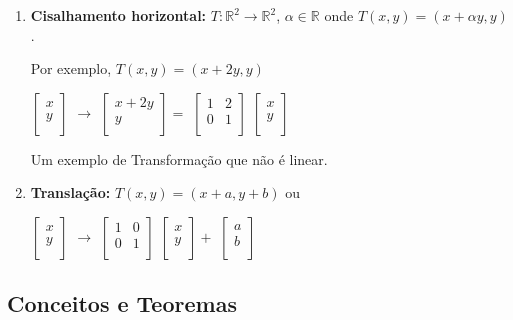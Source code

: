 \documentclass[oneside,a4paper,12pt]{article}
\begin{document}
\begin{enumerate}
	\vspace{150pt}
	
	\item {\bf Cisalhamento horizontal:} $T:\mathbb{R}^2 \rightarrow \mathbb{R}^2$, $\alpha \in \mathbb{R}$ onde $T(x,y) = (x + \alpha y, y)$.
	
	Por exemplo, $T(x,y) = (x + 2y, y)$ 
	
	$\left[
	\begin{array}{c}
	x\\
	y \\
	\end{array}
	\right]$ $\rightarrow$
	$\left[
	\begin{array}{c}
	x + 2y	\\
	y	\\
	\end{array}
	\right] = $
	$\left[
	\begin{array}{cc}
	1	&	2\\
	0	&	1 \\
	\end{array}
	\right]$
	$\left[
	\begin{array}{c}
	x\\
	y \\
	\end{array}
	\right]$
	
	
	Um exemplo de Transformação que não é linear.
	\item {\bf Translação:} $T(x,y) = (x + a,y + b)$ ou
	
	$\left[
	\begin{array}{c}
	x\\
	y \\
	\end{array}
	\right]$ $\rightarrow$
	$\left[
	\begin{array}{cc}
	1	&	0	\\
	0	&	1	\\
	\end{array}
	\right]  $
	$\left[
	\begin{array}{c}
	x \\
	y \\
	\end{array}
	\right] + $
	$\left[
	\begin{array}{c}
	a\\
	b \\
	\end{array}
	\right]$
	
\end{enumerate}

\subsection{Conceitos e Teoremas}
\end{document}
